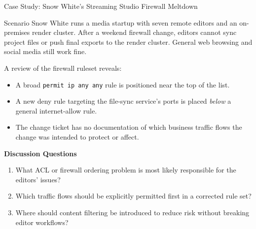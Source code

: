 \documentclass[aspectratio=169]{beamer}  %
\begin{document}
\begin{frame}{Case Study: Snow White's Streaming Studio Firewall Meltdown}
    \begin{block}{Scenario}
        \footnotesize
        Snow White runs a media startup with seven remote editors and an on-premises render cluster. After a weekend firewall change, editors cannot sync project files or push final exports to the render cluster. General web browsing and social media still work fine.

        A review of the firewall ruleset reveals:
        \begin{itemize}
            \item A broad \texttt{permit ip any any} rule is positioned near the top of the list.
            \item A new deny rule targeting the file-sync service's ports is placed \emph{below} a general internet-allow rule.
            \item The change ticket has no documentation of which business traffic flows the change was intended to protect or affect.
        \end{itemize}
    \end{block}
    \textbf{Discussion Questions}
    \begin{enumerate}
        \item What ACL or firewall ordering problem is most likely responsible for the editors' issues?
        \item Which traffic flows should be explicitly permitted first in a corrected rule set?
        \item Where should content filtering be introduced to reduce risk without breaking editor workflows?
    \end{enumerate}
\end{frame}
\end{document}
